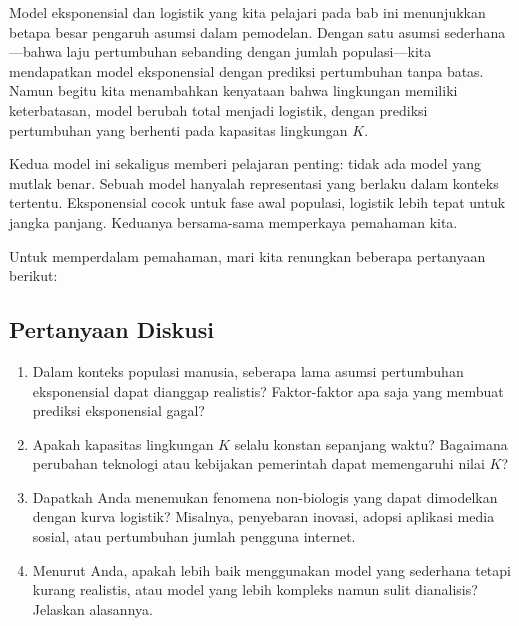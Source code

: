 \documentclass{bukumjh}
\begin{document}
Model eksponensial dan logistik yang kita pelajari pada bab ini menunjukkan betapa besar pengaruh asumsi dalam pemodelan. Dengan satu asumsi sederhana—bahwa laju pertumbuhan sebanding dengan jumlah populasi—kita mendapatkan model eksponensial dengan prediksi pertumbuhan tanpa batas. Namun begitu kita menambahkan kenyataan bahwa lingkungan memiliki keterbatasan, model berubah total menjadi logistik, dengan prediksi pertumbuhan yang berhenti pada kapasitas lingkungan $K$.  

Kedua model ini sekaligus memberi pelajaran penting: {\jsg tidak ada model yang mutlak benar}. Sebuah model hanyalah representasi yang berlaku dalam konteks tertentu. Eksponensial cocok untuk fase awal populasi, logistik lebih tepat untuk jangka panjang. Keduanya bersama-sama memperkaya pemahaman kita.

Untuk memperdalam pemahaman, mari kita renungkan beberapa pertanyaan berikut:

\subsection{Pertanyaan Diskusi}
\begin{enumerate}
    \item Dalam konteks populasi manusia, seberapa lama asumsi pertumbuhan eksponensial dapat dianggap realistis? Faktor-faktor apa saja yang membuat prediksi eksponensial gagal?
    \item Apakah kapasitas lingkungan $K$ selalu konstan sepanjang waktu? Bagaimana perubahan teknologi atau kebijakan pemerintah dapat memengaruhi nilai $K$?
    \item Dapatkah Anda menemukan fenomena non-biologis yang dapat dimodelkan dengan kurva logistik? Misalnya, penyebaran inovasi, adopsi aplikasi media sosial, atau pertumbuhan jumlah pengguna internet.
    \item Menurut Anda, apakah lebih baik menggunakan model yang sederhana tetapi kurang realistis, atau model yang lebih kompleks namun sulit dianalisis? Jelaskan alasannya.
\end{enumerate}
\end{document}
